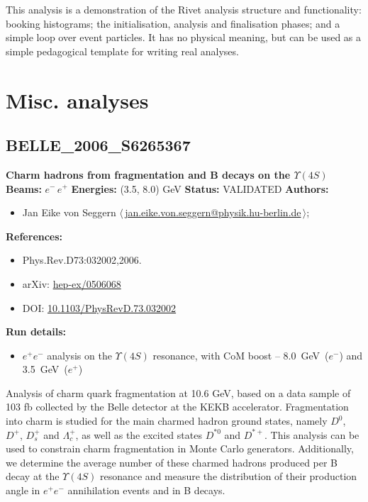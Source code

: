 \noindent This analysis is a demonstration of the Rivet analysis structure and functionality: booking histograms; the initialisation, analysis and finalisation phases; and a simple loop over event particles. It has no physical meaning, but can be used as a simple pedagogical template for writing real analyses.

\clearpage


\section{Misc. analyses}\subsection{BELLE\_2006\_S6265367}
\textbf{Charm hadrons from fragmentation and B decays on the $\Upsilon(4S)$}\newline
\textbf{Beams:} $e^-$\,$e^+$ \newline
\textbf{Energies:} (3.5, 8.0) GeV \newline
\textbf{Status:} VALIDATED\newline
\textbf{Authors:}
\begin{itemize}
  \item Jan Eike von Seggern $\langle\,$\href{mailto:jan.eike.von.seggern@physik.hu-berlin.de}{jan.eike.von.seggern@physik.hu-berlin.de}$\,\rangle$;
\end{itemize}
\textbf{References:}
\begin{itemize}
  \item Phys.Rev.D73:032002,2006.
  \item arXiv: \href{http://arxiv.org/abs/hep-ex/0506068}{hep-ex/0506068}
  \item DOI: \href{http://dx.doi.org/10.1103/PhysRevD.73.032002}{10.1103/PhysRevD.73.032002}
\end{itemize}
\textbf{Run details:}
\begin{itemize}

  \item $e^+ e^-$ analysis on the $\Upsilon(4S)$ resonance, with CoM boost -- 8.0~GeV~($e^−$) and 3.5~GeV~($e^+$)\end{itemize}

\noindent Analysis of charm quark fragmentation at 10.6 GeV, based on a data sample of 103 fb collected by the Belle detector at the KEKB accelerator. Fragmentation into charm is studied for the main charmed hadron ground states, namely $D^0$, $D^+$, $D^+_s$ and $\Lambda_c^+$, as well as the excited states $D^{*0}$ and $D^{*+}$. This analysis can be used to constrain charm fragmentation in Monte Carlo generators. Additionally, we determine the average number of these charmed hadrons produced per B decay at the $\Upsilon(4S)$ resonance and measure the distribution of their production angle in $e^+ e^-$ annihilation events and in B decays.

